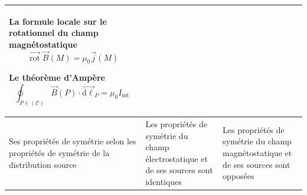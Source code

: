 \documentclass[a4paper,12pt]{book}
\begin{document}
\begin{landscape}
\begin{table}[h]
\begin{tabular}{|m{4cm}<{\centering}|m{10cm}<{\centering}|m{10cm}<{\centering}|}
    La  formule locale sur le rotationnel du champ magnétostatique $$\overrightarrow{\operatorname{rot}} \vec{B}(M)=\mu_{0} \vec{j}(M)$$

    
    Le théorème d'Ampère $$\oint_{P \in(\mathscr{C})} \vec{B}(P) \cdot \overrightarrow{\mathrm{d} \ell}_{P}=\mu_{0} I_{\text {int }}$$
    \\ \hline
    
    
    Ses propriétés de symétrie selon les propriétés de symétrie de la distribution source &
    Les propriétés de symétrie du champ électrostatique et de ses sources sont identiques & 
    Les propriétés de symétrie du champ magnétostatique et de ses sources sont opposées
    \\ \hline 
    
    
    
     \hline
    \end{tabular}
    \end{table}
\end{landscape}
    
\end{document}
